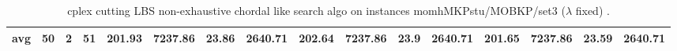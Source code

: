 \begin{sidewaystable}[!ht]
{\begin{tabular}{lccccccccccccccc}
\cline{1-16} \textbf{avg} & \textbf{50} & \textbf{2} & \textbf{51} & \textbf{201.93} & \textbf{7237.86} & \textbf{23.86} & \textbf{2640.71} & \textbf{202.64} & \textbf{7237.86} & \textbf{23.9} & \textbf{2640.71} & \textbf{201.65} & \textbf{7237.86} & \textbf{23.59} & \textbf{2640.71} \\ \cline{1-16}
\bottomrule
\end{tabular}
}%
\caption{cplex cutting LBS non-exhaustive chordal like search algo on instances momhMKPstu/MOBKP/set3 ($\lambda$ fixed) .}
\label{tab:table_lambda_chordal_momhMKPstu/MOBKP/set3 }
\end{sidewaystable}
